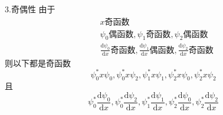 3.奇偶性
由于
\begin{equation}
    \begin{aligned}
        &x\text{奇函数}
\\
&\psi _0\text{偶函数},\psi _1\text{奇函数},\psi _2\text{偶函数}
\\
&\frac{\mathrm{d}\psi _0}{\mathrm{d}x}\text{奇函数},\frac{\mathrm{d}\psi _1}{\mathrm{d}x}\text{偶函数},\frac{\mathrm{d}\psi _2}{\mathrm{d}x}\text{奇函数}
    \end{aligned}
\end{equation}
则以下都是奇函数
\begin{equation}
    \psi _{0}^{*}x\psi _0,\psi _{0}^{*}x\psi _2,\psi _{1}^{*}x\psi _1,\psi _{2}^{*}x\psi _0,\psi _{2}^{*}x\psi _2
\end{equation}
且
\begin{equation}
    \psi _{0}^{*}\frac{\mathrm{d}\psi _0}{\mathrm{d}x},\psi _{0}^{*}\frac{\mathrm{d}\psi _2}{\mathrm{d}x},\psi _{1}^{*}\frac{\mathrm{d}\psi _1}{\mathrm{d}x},\psi _{2}^{*}\frac{\mathrm{d}\psi _0}{\mathrm{d}x},\psi _{2}^{*}\frac{\mathrm{d}\psi _2}{\mathrm{d}x}
\end{equation}

